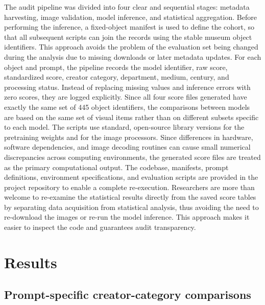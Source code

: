 \documentclass[pdflatex,sn-basic,Numbered]{sn-jnl}
\begin{document}
The audit pipeline was divided into four clear and sequential stages: metadata harvesting, image validation, model inference, and statistical aggregation. Before performing the inference, a fixed-object manifest is used to define the cohort, so that all subsequent scripts can join the records using the stable museum object identifiers. This approach avoids the problem of the evaluation set being changed during the analysis due to missing downloads or later metadata updates. For each object and prompt, the pipeline records the model identifier, raw score, standardized score, creator category, department, medium, century, and processing status. Instead of replacing missing values and inference errors with zero scores, they are logged explicitly. Since all four score files generated have exactly the same set of 445 object identifiers, the comparisons between models are based on the same set of visual items rather than on different subsets specific to each model.
The scripts use standard, open-source library versions for the pretraining weights and for the image processors. Since differences in hardware, software dependencies, and image decoding routines can cause small numerical discrepancies across computing environments, the generated score files are treated as the primary computational output. The codebase, manifests, prompt definitions, environment specifications, and evaluation scripts are provided in the project repository to enable a complete re-execution. Researchers are more than welcome to re-examine the statistical results directly from the saved score tables by separating data acquisition from statistical analysis, thus avoiding the need to re-download the images or re-run the model inference. This approach makes it easier to inspect the code and guarantees audit transparency.


\section{Results}
\label{sec:results}

\subsection{Prompt-specific creator-category comparisons}
\end{document}
